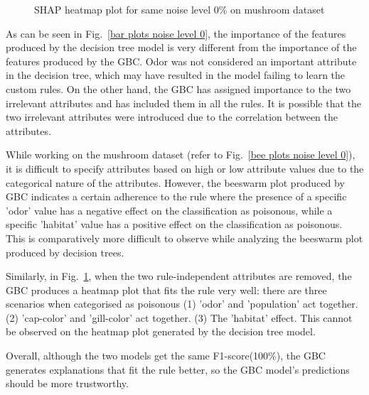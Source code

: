 \documentclass[runningheads,a4paper]{llncs}
\begin{document}
\begin{figure}[H]
	\centering
	
	\hfill
	
	
	\caption{SHAP heatmap plot for same noise level 0\% on mushroom dataset}
	\label{heat plots noise level 0}
	
\end{figure}
As can be seen in Fig.~\ref{bar plots noise level 0}, the importance of the features produced by the decision tree model is very different from the importance of the features produced by the GBC.
Odor was not considered an important attribute in the decision tree, which may have resulted in the model failing to learn the custom rules. On the other hand, the GBC has assigned importance to the two irrelevant attributes and has included them in all the rules. It is possible that the two irrelevant attributes were introduced due to the correlation between the attributes.

While working on the mushroom dataset (refer to Fig.~\ref{bee plots noise level 0}), it is difficult to specify attributes based on high or low attribute values due to the categorical nature of the attributes. However, the beeswarm plot produced by GBC indicates a certain adherence to the rule where the presence of a specific 'odor' value has a negative effect on the classification as poisonous, while a specific 'habitat' value has a positive effect on the classification as poisonous. This is comparatively more difficult to observe while analyzing the beeswarm plot produced by decision trees.

Similarly, in Fig.~\ref{heat plots noise level 0}, when the two rule-independent attributes are removed, the GBC produces a heatmap plot that fits the rule very well: there are three scenarios when categorised as poisonous (1) 'odor' and 'population' act together. (2) 'cap-color' and 'gill-color' act together. (3) The 'habitat' effect. This cannot be observed on the heatmap plot generated by the decision tree model.

Overall, although the two models get the same F1-score(100\%), the GBC generates explanations that fit the rule better, so the GBC model's predictions should be more trustworthy.
\end{document}
